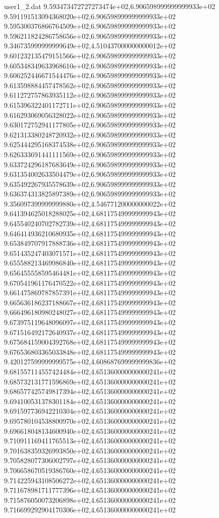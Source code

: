 \begin{filecontents}{user1_2.dat}
9.593473472727273474e+02,6.906598999999999933e+02
9.591191513094368020e+02,6.906598999999999933e+02
9.595300376866764509e+02,6.906598999999999933e+02
9.596211824286758656e+02,6.906598999999999933e+02
9.346735999999999649e+02,4.510437000000000012e+02
9.601232135479151566e+02,6.906598999999999933e+02
9.605348349633968610e+02,6.906598999999999933e+02
9.606252446671544476e+02,6.906598999999999933e+02
9.613598884457478562e+02,6.906598999999999933e+02
9.611272757863935112e+02,6.906598999999999933e+02
9.615396322401172711e+02,6.906598999999999933e+02
9.616293069056328022e+02,6.906598999999999933e+02
9.630172752941177805e+02,6.906598999999999933e+02
9.621313380248720932e+02,6.906598999999999933e+02
9.625444295168374538e+02,6.906598999999999933e+02
9.626333691441111569e+02,6.906598999999999933e+02
9.633724296187683649e+02,6.906598999999999933e+02
9.631354002633504479e+02,6.906598999999999933e+02
9.635492267935578639e+02,6.906598999999999933e+02
9.636374313825897389e+02,6.906598999999999933e+02
9.356097399999999880e+02,4.546771200000000022e+02
9.641394625018288025e+02,4.681175499999999943e+02
9.645540240702782739e+02,4.681175499999999943e+02
9.646414936210680935e+02,4.681175499999999943e+02
9.653849707917888736e+02,4.681175499999999943e+02
9.651435247403071571e+02,4.681175499999999943e+02
9.655588213469986840e+02,4.681175499999999943e+02
9.656455558595464481e+02,4.681175499999999943e+02
9.670541961176470522e+02,4.681175499999999943e+02
9.661475869787857391e+02,4.681175499999999943e+02
9.665636186237188667e+02,4.681175499999999943e+02
9.666496180980248027e+02,4.681175499999999943e+02
9.673975119648096097e+02,4.681175499999999943e+02
9.671516492172640937e+02,4.681175499999999943e+02
9.675684159004392768e+02,4.681175499999999943e+02
9.676536803365033848e+02,4.681175499999999943e+02
9.420127599999999575e+02,4.608687699999999836e+02
9.681557114557424484e+02,4.651360000000000241e+02
9.685732131771596869e+02,4.651360000000000241e+02
9.686577425749817394e+02,4.651360000000000241e+02
9.694100531378301184e+02,4.651360000000000241e+02
9.691597736942210304e+02,4.651360000000000241e+02
9.695780104538800970e+02,4.651360000000000241e+02
9.696618048134600940e+02,4.651360000000000241e+02
9.710911169411765513e+02,4.651360000000000241e+02
9.701638359326993850e+02,4.651360000000000241e+02
9.705828077306002797e+02,4.651360000000000241e+02
9.706658670519386760e+02,4.651360000000000241e+02
9.714225943108506272e+02,4.651360000000000241e+02
9.711678981711777396e+02,4.651360000000000241e+02
9.715876050073206898e+02,4.651360000000000241e+02
9.716699292904170306e+02,4.651360000000000241e+02

\end{filecontents}
